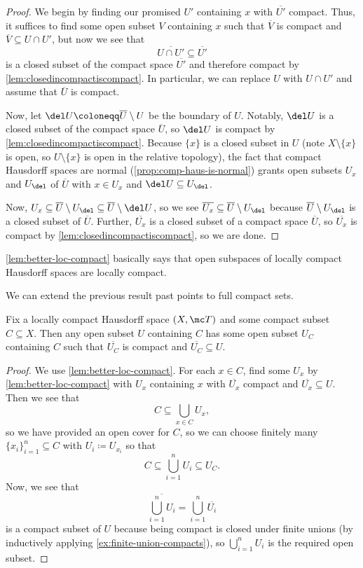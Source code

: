 \documentclass[../notes.tex]{subfiles}
\begin{document}
\begin{proof}
	We begin by finding our promised $U'$ containing $x$ with $\overline{U'}$ compact. Thus, it suffices to find some open subset $V$ containing $x$ such that $\overline V$ is compact and $\overline V\subseteq U\cap U'$, but now we see that
	\[\overline{U\cap U'}\subseteq\overline{U'}\]
	is a closed subset of the compact space $\overline{U'}$ and therefore compact by \autoref{lem:closedincompactiscompact}. In particular, we can replace $U$ with $U\cap U'$ and assume that $\overline U$ is compact.

	Now, let $\del U\coloneqq\overline U\setminus U$ be the boundary of $U$. Notably, $\del U$ is a closed subset of the compact space $\overline U$, so $\del U$ is compact by \autoref{lem:closedincompactiscompact}. Because $\{x\}$ is a closed subset in $U$ (note $X\setminus\{x\}$ is open, so $U\setminus\{x\}$ is open in the relative topology), the fact that compact Hausdorff spaces are normal (\autoref{prop:comp-haus-is-normal}) grants open subsets $U_x$ and $U_{\del}$ of $\overline U$ with $x\in U_x$ and $\del U\subseteq U_\del$.

	Now, $U_x\subseteq\overline U\setminus U_\del\subseteq\overline U\setminus{\del U}$, so we see $\overline{U_x}\subseteq\overline U\setminus U_\del$ because $\overline U\setminus U_\del$ is a closed subset of $\overline U$. Further, $\overline{U_x}$ is a closed subset of a compact space $\overline U$, so $\overline{U_x}$ is compact by \autoref{lem:closedincompactiscompact}, so we are done.
\end{proof}
\begin{remark}
	\autoref{lem:better-loc-compact} basically says that open subspaces of locally compact Hausdorff spaces are locally compact.
\end{remark}
We can extend the previous result past points to full compact sets.
\begin{proposition} \label{prop:best-loc-compact}
	Fix a locally compact Hausdorff space $(X,\mc T)$ and some compact subset $C\subseteq X$. Then any open subset $U$ containing $C$ has some open subset $U_C$ containing $C$ such that $\overline{U_C}$ is compact and $\overline{U_C}\subseteq U$.
\end{proposition}
\begin{proof}
	We use \autoref{lem:better-loc-compact}. For each $x\in C$, find some $U_x$ by \autoref{lem:better-loc-compact} with $U_x$ containing $x$ with $\overline{U_x}$ compact and $\overline{U_x}\subseteq U$. Then we see that
	\[C\subseteq\bigcup_{x\in C}U_x,\]
	so we have provided an open cover for $C$, so we can choose finitely many $\{x_i\}_{i=1}^n\subseteq C$ with $U_i\coloneqq U_{x_i}$ so that
	\[C\subseteq\bigcup_{i=1}^nU_i\subseteq U_C.\]
	Now, we see that
	\[\overline{\bigcup_{i=1}^nU_i}=\bigcup_{i=1}^n\overline{U_i}\]
	is a compact subset of $U$ because being compact is closed under finite unions (by inductively applying \autoref{ex:finite-union-compacts}), so $\bigcup_{i=1}^nU_i$ is the required open subset.
\end{proof}
\end{document}

